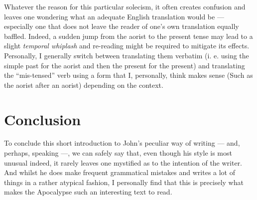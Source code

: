 Whatever the reason for this particular solecism, it often creates confusion and leaves one wondering what an adequate English translation would be — especially one that does not leave the reader of one’s own translation equally baffled. Indeed, a sudden jump from the aorist to the present tense may lead to a slight \textit{temporal whiplash} and re-reading might be required to mitigate its effects. Personally, I generally switch between translating them verbatim (i. e. using the simple past for the aorist and then the present for the present) and translating the “mis-tensed” verb using a form that I, personally, think makes sense (Such as the aorist after an aorist) depending on the context. 

\section*{Conclusion}
  
To conclude this short introduction to John's peculiar way of writing — and, perhaps, speaking —, we can safely say that, even though his style is most unusual indeed, it rarely leaves one mystified as to the intention of the writer. And whilst he does make frequent grammatical mistakes and writes a lot of things in a rather atypical fashion, I personally find that this is precisely what makes the Apocalypse such an interesting text to read.


  
